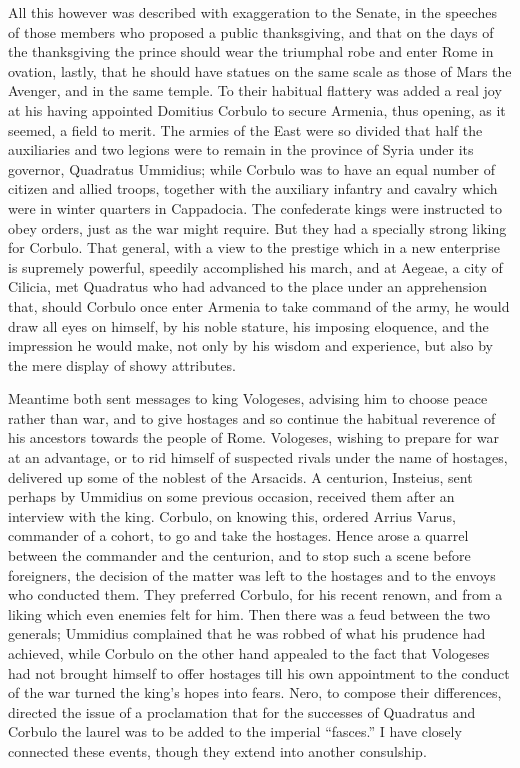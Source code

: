 All this however was described with exaggeration to the Senate, in the speeches of those members who proposed a public thanksgiving, and that on the days of the thanksgiving the prince should wear the triumphal robe and enter Rome in ovation, lastly, that he should have statues on the same scale as those of Mars the Avenger, and in the same temple. To their habitual flattery was added a real joy at his having appointed Domitius Corbulo to secure Armenia, thus opening, as it seemed, a field to merit. The armies of the East were so divided that half the auxiliaries and two legions were to remain in the province of Syria under its governor, Quadratus Ummidius; while Corbulo was to have an equal number of citizen and allied troops, together with the auxiliary infantry and cavalry which were in winter quarters in Cappadocia. The confederate kings were instructed to obey orders, just as the war might require. But they had a specially strong liking for Corbulo. That general, with a view to the prestige which in a new enterprise is supremely powerful, speedily accomplished his march, and at Aegeae, a city of Cilicia, met Quadratus who had advanced to the place under an apprehension that, should Corbulo once enter Armenia to take command of the army, he would draw all eyes on himself, by his noble stature, his imposing eloquence, and the impression he would make, not only by his wisdom and experience, but also by the mere display of showy attributes.


Meantime both sent messages to king Vologeses, advising him to choose peace rather than war, and to give hostages and so continue the habitual reverence of his ancestors towards the people of Rome. Vologeses, wishing to prepare for war at an advantage, or to rid himself of suspected rivals under the name of hostages, delivered up some of the noblest of the Arsacids. A centurion, Insteius, sent perhaps by Ummidius on some previous occasion, received them after an interview with the king. Corbulo, on knowing this, ordered Arrius Varus, commander of a cohort, to go and take the hostages. Hence arose a quarrel between the commander and the centurion, and to stop such a scene before foreigners, the decision of the matter was left to the hostages and to the envoys who conducted them. They preferred Corbulo, for his recent renown, and from a liking which even enemies felt for him. Then there was a feud between the two generals; Ummidius complained that he was robbed of what his prudence had achieved, while Corbulo on the other hand appealed to the fact that Vologeses had not brought himself to offer hostages till his own appointment to the conduct of the war turned the king's hopes into fears. Nero, to compose their differences, directed the issue of a proclamation that for the successes of Quadratus and Corbulo the laurel was to be added to the imperial ``fasces.'' I have closely connected these events, though they extend into another consulship.


